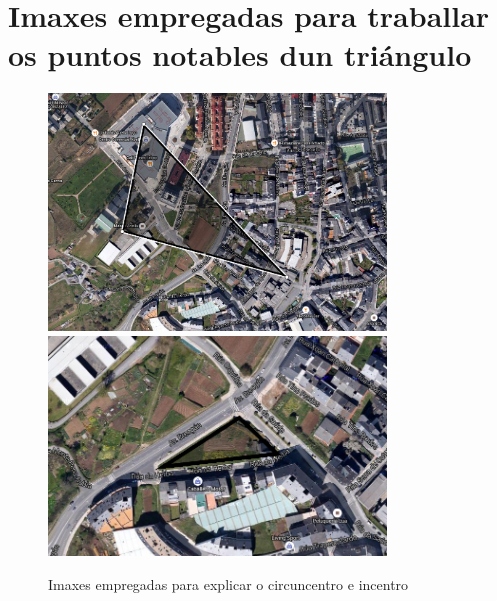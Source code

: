 \section{Imaxes empregadas para traballar os puntos notables dun triángulo}\label{fich:notables}
\begin{figure}[h!]
  \centering
  \includegraphics[width=0.8\textwidth]{img/circuncentro.png}
  \includegraphics[width=0.8\textwidth]{img/incentro.png}
  \caption{Imaxes empregadas para explicar o circuncentro e incentro}\label{fig:act12-1}\label{fig:act12-2}
\end{figure}
\newpage









